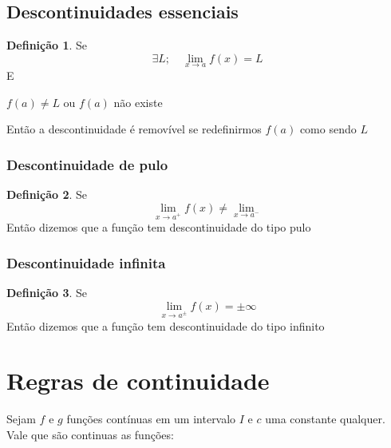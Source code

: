 \documentclass[14pt]{extreport}
\theoremstyle{definition}
\newtheorem{definition}{Definição}
\begin{document}
\subsection{Descontinuidades essenciais}


\begin{definition}
    Se
    \begin{equation*}
        \exists L; \quad \lim_{x \to a} f(x) = L
    \end{equation*}
    E
    \begin{center}
        \(f(a) \neq L\) ou \(f(a)\) não existe
    \end{center}
    Então a descontinuidade é removível se redefinirmos \(f(a)\) como sendo \(L\)
\end{definition}

\subsubsection{Descontinuidade de pulo}

\begin{definition}
    Se
    \begin{equation}
       \lim_{x \to a^+} f(x) \neq \lim_{x \to a^-}
    \end{equation}
    Então dizemos que a função tem descontinuidade do tipo pulo
\end{definition}

\subsubsection{Descontinuidade infinita}

\begin{definition}
    Se
    \begin{equation}
       \lim_{x \to a^{\pm}} f(x) = \pm \infty
    \end{equation}
    Então dizemos que a função tem descontinuidade do tipo infinito
\end{definition}


\section{Regras de continuidade}

Sejam \(f\) e \(g\) funções contínuas em um intervalo \(I\) e \(c\) uma constante qualquer.
Vale que são continuas as funções:
\end{document}
